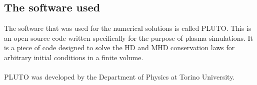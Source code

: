 \subsection*{The software used}

The software that was used for the numerical solutions is called PLUTO. This is an open source code written specifically for the purpose of plasma simulations. It is a piece of code designed to solve the HD and MHD conservation laws for arbitrary initial conditions in a finite volume.\\
\\
PLUTO was developed by the Department of Physics at Torino University.  \cite{pluto-manual}


